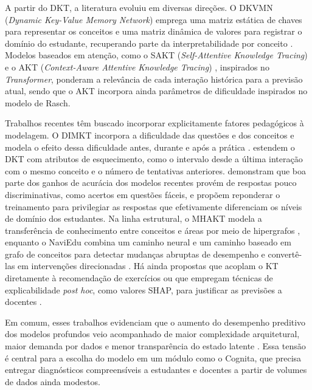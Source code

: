 A partir do DKT, a literatura evoluiu em diversas direções. O DKVMN (\textit{Dynamic Key-Value Memory Network}) emprega uma matriz estática de chaves para representar os conceitos e uma matriz dinâmica de valores para registrar o domínio do estudante, recuperando parte da interpretabilidade por conceito \cite{zhang_dynamic_2017}. Modelos baseados em atenção, como o SAKT (\textit{Self-Attentive Knowledge Tracing}) \cite{pandey_self-attentive_2019} e o AKT (\textit{Context-Aware Attentive Knowledge Tracing}) \cite{ghosh_context-aware_2020}, inspirados no \textit{Transformer}, ponderam a relevância de cada interação histórica para a previsão atual, sendo que o AKT incorpora ainda parâmetros de dificuldade inspirados no modelo de Rasch.

Trabalhos recentes têm buscado incorporar explicitamente fatores pedagógicos à modelagem. O DIMKT incorpora a dificuldade das questões e dos conceitos e modela o efeito dessa dificuldade antes, durante e após a prática \cite{shen_assessing_2022}.  estendem o DKT com atributos de esquecimento, como o intervalo desde a última interação com o mesmo conceito e o número de tentativas anteriores.  demonstram que boa parte dos ganhos de acurácia dos modelos recentes provém de respostas pouco discriminativas, como acertos em questões fáceis, e propõem reponderar o treinamento para privilegiar as respostas que efetivamente diferenciam os níveis de domínio dos estudantes. Na linha estrutural, o MHAKT modela a transferência de conhecimento entre conceitos e áreas por meio de hipergrafos \cite{liu_enhancing_2026}, enquanto o NaviEdu combina um caminho neural e um caminho baseado em grafo de conceitos para detectar mudanças abruptas de desempenho e convertê-las em intervenções direcionadas \cite{liao_naviedu_2026}. Há ainda propostas que acoplam o KT diretamente à recomendação de exercícios \cite{gao_transformer-based_2025} ou que empregam técnicas de explicabilidade \textit{post hoc}, como valores SHAP, para justificar as previsões a docentes \cite{cao_multi-granularity_2025}.

Em comum, esses trabalhos evidenciam que o aumento do desempenho preditivo dos modelos profundos veio acompanhado de maior complexidade arquitetural, maior demanda por dados e menor transparência do estado latente \cite{liu_enhancing_2026, cao_multi-granularity_2025}. Essa tensão é central para a escolha do modelo em um módulo como o Cognita, que precisa entregar diagnósticos compreensíveis a estudantes e docentes a partir de volumes de dados ainda modestos.

